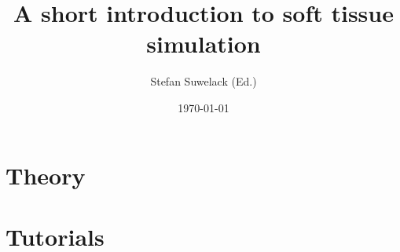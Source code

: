 \documentclass[11pt,a4paper]{book}              %
\title{\bf A short introduction to soft tissue simulation}    %
\author{Stefan Suwelack (Ed.)}              %
\date{\today}                           %
\begin{document}
\frontmatter                            %
\maketitle                              %
\tableofcontents                        %
\mainmatter                             %
\part{Theory}                   %
\part{Tutorials}


\end{document}
